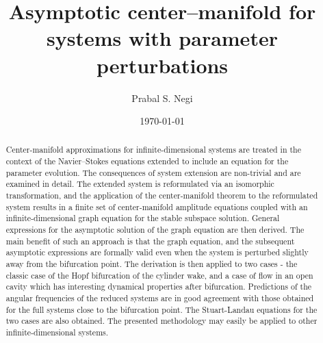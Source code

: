 \documentclass[aps,prr,twocolumn,groupedaddress]{revtex4-2}
\begin{document}
	
\title{Asymptotic center--manifold for systems with parameter perturbations}
\author{Prabal S. Negi}

\date{\today}

\begin{abstract}
Center-manifold approximations for infinite-dimensional systems are treated in the context of the Navier--Stokes equations extended to include an equation for the parameter evolution. The consequences of system extension are non-trivial and are examined in detail. The extended system is reformulated via an isomorphic transformation, and the application of the center-manifold theorem to the reformulated system results in a finite set of center-manifold amplitude equations coupled with an infinite-dimensional graph equation for the stable subspace solution. General expressions for the asymptotic solution of the graph equation are then derived. The main benefit of such an approach is that the graph equation, and the subsequent asymptotic expressions are formally valid even when the system is perturbed slightly away from the bifurcation point. The derivation is then applied to two cases - the classic case of the Hopf bifurcation of the cylinder wake, and a case of flow in an open cavity which has interesting dynamical properties after bifurcation. Predictions of the angular frequencies of the reduced systems are in good agreement with those obtained for the full systems close to the bifurcation point. The Stuart-Landau equations for the two cases are also obtained. The presented methodology may easily be applied to other infinite-dimensional systems. 
\end{abstract}

\maketitle

%

%
%


\FloatBarrier



\end{document}
